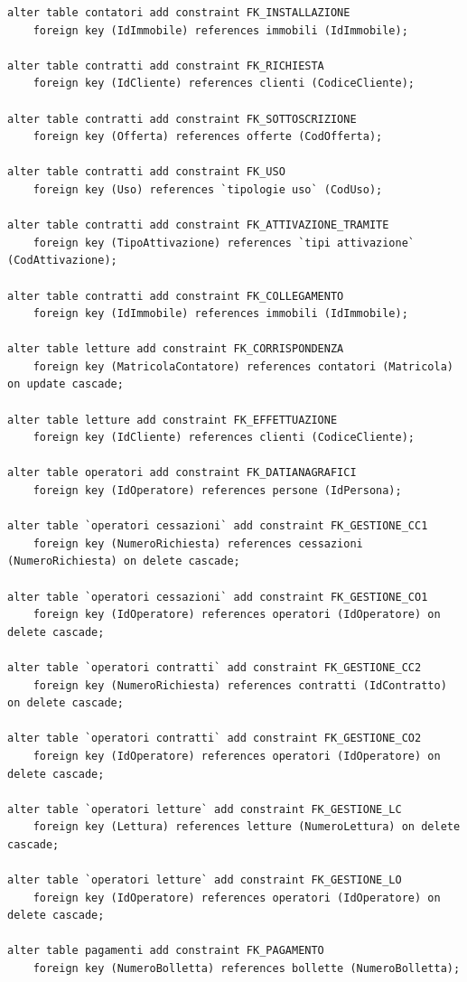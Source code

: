 \documentclass[a4paper,12pt]{report}
\begin{document}
\begin{lstlisting}
alter table contatori add constraint FK_INSTALLAZIONE
    foreign key (IdImmobile) references immobili (IdImmobile);
     
alter table contratti add constraint FK_RICHIESTA
    foreign key (IdCliente) references clienti (CodiceCliente);

alter table contratti add constraint FK_SOTTOSCRIZIONE
    foreign key (Offerta) references offerte (CodOfferta);

alter table contratti add constraint FK_USO
    foreign key (Uso) references `tipologie uso` (CodUso);

alter table contratti add constraint FK_ATTIVAZIONE_TRAMITE
    foreign key (TipoAttivazione) references `tipi attivazione` (CodAttivazione);

alter table contratti add constraint FK_COLLEGAMENTO
    foreign key (IdImmobile) references immobili (IdImmobile);

alter table letture add constraint FK_CORRISPONDENZA
    foreign key (MatricolaContatore) references contatori (Matricola) on update cascade;
     
alter table letture add constraint FK_EFFETTUAZIONE
    foreign key (IdCliente) references clienti (CodiceCliente);
     
alter table operatori add constraint FK_DATIANAGRAFICI
    foreign key (IdOperatore) references persone (IdPersona);
    
alter table `operatori cessazioni` add constraint FK_GESTIONE_CC1
    foreign key (NumeroRichiesta) references cessazioni (NumeroRichiesta) on delete cascade;
    
alter table `operatori cessazioni` add constraint FK_GESTIONE_CO1
    foreign key (IdOperatore) references operatori (IdOperatore) on delete cascade;

alter table `operatori contratti` add constraint FK_GESTIONE_CC2
    foreign key (NumeroRichiesta) references contratti (IdContratto) on delete cascade;
    
alter table `operatori contratti` add constraint FK_GESTIONE_CO2
    foreign key (IdOperatore) references operatori (IdOperatore) on delete cascade;

alter table `operatori letture` add constraint FK_GESTIONE_LC
    foreign key (Lettura) references letture (NumeroLettura) on delete cascade;
    
alter table `operatori letture` add constraint FK_GESTIONE_LO
    foreign key (IdOperatore) references operatori (IdOperatore) on delete cascade;

alter table pagamenti add constraint FK_PAGAMENTO
    foreign key (NumeroBolletta) references bollette (NumeroBolletta);
\end{lstlisting}
\end{document}
